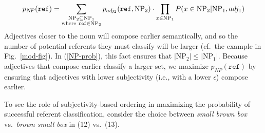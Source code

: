 \documentclass{sp}
\begin{document}
\begin{equation}
\label{NP-prob}
p_{N\!P}(\texttt{ref}) = \sum_{\substack{\textrm{NP}_2\subseteq\textrm{NP}_1\\ \textrm{where}\ \texttt{ref}\in\textrm{NP}_2}} p_{adj_2}(\texttt{ref}, \textrm{NP}_2) \cdot \prod_{x \in \textrm{NP}_1} P(x \in \textrm{NP}_2 | \textrm{NP}_1, adj_1)  \\
\end{equation}
%
%
%
Adjectives closer to the noun will compose earlier semantically, and so the number of potential referents they must classify will be larger (cf.~the example in Fig.~\ref{mod-fig}). In (\ref{NP-prob}), this fact ensures that $|\textrm{NP}_2| \leq |\textrm{NP}_1|$. 
Because adjectives that compose earlier classify a larger set, we maximize $p_{N\!P}(\texttt{ref})$ by ensuring that adjectives with lower subjectivity (i.e., with a lower $\epsilon$) compose earlier.

To see the role of subjectivity-based ordering in maximizing the probability of successful referent classification, consider the choice between \emph{small brown box} vs.~\emph{brown small box} in (12) vs.~(13).\\ 
\end{document}
